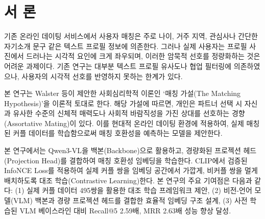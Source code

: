 \section{서 론}

기존 온라인 데이팅 서비스에서 사용자 매칭은 주로 나이, 거주 지역, 관심사나 간단한 자기소개 문구 같은 텍스트 프로필 정보에 의존한다. 그러나 실제 사용자는 프로필 사진에서 드러나는 시각적 요인에 크게 좌우되며, 이러한 암묵적 선호를 정량화하는 것은 어려운 과제이다. 기존 연구\cite{schroff2015}\cite{hermans2017}는 대부분 텍스트 프로필 유사도나 협업 필터링에 의존하였으나, 사용자의 시각적 선호를 반영하지 못하는 한계가 있다.

본 연구는 Walster 등이 제안한 사회심리학적 이론인 `매칭 가설(The Matching Hypothesis)'\cite{walster1966}을 이론적 토대로 한다. 해당 가설에 따르면, 개인은 파트너 선택 시 자신과 유사한 수준의 신체적 매력도나 사회적 바람직성을 가진 상대를 선호하는 경향(Assortative Mating)이 있다. 이를 현대적 온라인 데이팅 환경에 적용하여, 실제 매칭된 커플 데이터를 학습함으로써 매칭 호환성을 예측하는 모델을 제안한다.

본 연구에서는 Qwen3-VL\cite{qwen2023}을 백본(Backbone)으로 활용하고, 경량화된 프로젝션 헤드(Projection Head)를 결합하여 매칭 호환성 임베딩을 학습한다. CLIP\cite{radford2021}에서 검증된 InfoNCE Loss를 적용하여 실제 커플 쌍을 임베딩 공간에서 가깝게, 비커플 쌍을 멀게 배치하도록 대조 학습(Contrastive Learning)한다. 본 연구의 주요 기여점은 다음과 같다: (1) 실제 커플 데이터 495쌍을 활용한 대조 학습 프레임워크 제안, (2) 비전-언어 모델(VLM) 백본과 경량 프로젝션 헤드를 결합한 효율적 임베딩 구조 설계, (3) 사전 학습된 VLM 베이스라인 대비 Recall@5 2.59배, MRR 2.63배 성능 향상 달성.

